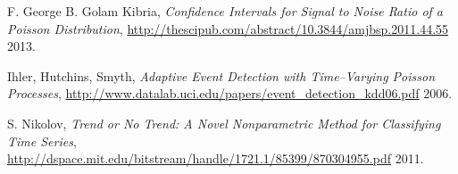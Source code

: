 \documentclass{article}
\begin{document}
\begin{thebibliography}{2013}

 F. George B. Golam Kibria, \textsl{Confidence
    Intervals for Signal to Noise Ratio of a Poisson Distribution},
    \url{http://thescipub.com/abstract/10.3844/amjbsp.2011.44.55} 2013.

 Ihler, Hutchins, Smyth, \textsl{Adaptive Event
    Detection with Time–Varying Poisson Processes},
    \url{http://www.datalab.uci.edu/papers/event_detection_kdd06.pdf} 2006.

 S. Nikolov, \textsl{Trend or No Trend: A Novel
    Nonparametric Method for Classifying Time Series},
    \url{http://dspace.mit.edu/bitstream/handle/1721.1/85399/870304955.pdf}
    2011.  

\end{thebibliography}


\end{document}
